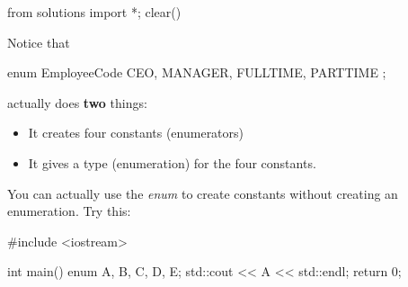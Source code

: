 \begin{python0}
from solutions import *; clear()
\end{python0}

Notice that

\begin{consolethree}[escapeinside=||]
enum EmployeeCode
{
    CEO, MANAGER, FULLTIME, PARTTIME
};
\end{consolethree}

actually does \textbf{two} things:

\begin{itemize}
\item It creates four constants (enumerators)
\item It gives a type (enumeration) for the four constants.
\end{itemize}

You can actually use the \textit{enum} to create constants without
creating an enumeration. Try this:

\begin{consolethree}[escapeinside=||]
#include <iostream>

int main()
{
    enum {A, B, C, D, E};
    std::cout << A << std::endl;
    return 0;
}
\end{consolethree}



